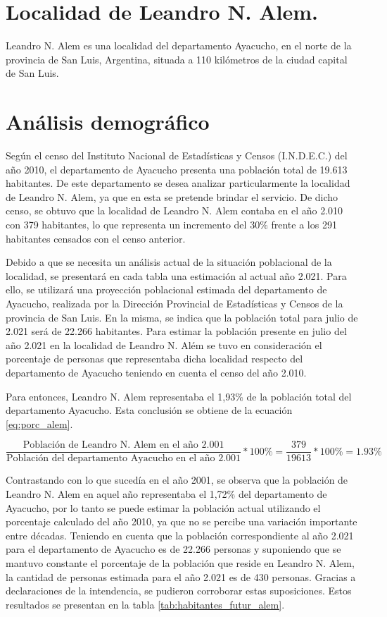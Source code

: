 \documentclass[11pt,a4paper]{article}
\begin{document}
\section{Localidad de Leandro N. Alem.}

Leandro N. Alem es una localidad del departamento Ayacucho, en el norte de la provincia de San Luis, Argentina, situada a 110 kilómetros de la ciudad capital de San Luis.


\section{Análisis demográfico}
Según el censo del Instituto Nacional de Estadísticas y Censos (I.N.D.E.C.) del año 2010, el departamento de Ayacucho presenta una población total de 19.613 habitantes. De este departamento se desea analizar particularmente la localidad de Leandro N. Alem, ya que en esta se pretende brindar el servicio. De dicho censo, se obtuvo que la localidad de Leandro N. Alem contaba en el año 2.010 con 379 habitantes, lo que representa un incremento del 30$\%$ frente a los 291 habitantes censados con el censo anterior.

Debido a que se necesita un análisis actual de la situación poblacional de la localidad, se presentará en cada tabla una estimación al actual año 2.021. Para ello, se utilizará una proyección poblacional estimada del departamento de Ayacucho, realizada por la Dirección Provincial de Estadísticas y Censos de la provincia de San Luis. En la misma, se indica que la población total para julio de 2.021 será de 22.266 habitantes. Para estimar la población presente en julio del año 2.021 en la localidad de Leandro N. Além se tuvo en consideración el porcentaje de personas que representaba dicha localidad respecto del departamento de Ayacucho teniendo en cuenta el censo del año 2.010.

Para entonces, Leandro N. Alem representaba el 1,93$\%$ de la población total del departamento Ayacucho. 
Esta conclusión se obtiene de la ecuación \ref{eq:porc_alem}.

\begin{equation}
    \frac{\text{Población de Leandro N. Alem en el año 2.001}}{\text{Población del departamento Ayacucho en el año 2.001}}*100\%=\frac{379}{19613}*100\%=1.93\%
    \label{eq:porc_alem}
\end{equation}

Contrastando con lo que sucedía en el año 2001, se observa que la población de Leandro N. Alem en aquel año representaba el 1,72\% del departamento de Ayacucho,
por lo tanto se puede estimar la población actual utilizando el porcentaje calculado del año 2010, ya que no se percibe una variación importante entre décadas. 
Teniendo en cuenta que la población correspondiente al año 2.021 para el departamento de Ayacucho es de 22.266 personas y suponiendo que se mantuvo constante el porcentaje de la población que reside en Leandro N. Alem, la cantidad de personas estimada para el año 2.021 es de 430 personas. 
Gracias a declaraciones de la intendencia, se pudieron corroborar estas suposiciones. 
Estos resultados se presentan en la tabla \ref{tab:habitantes_futur_alem}.
\end{document}
